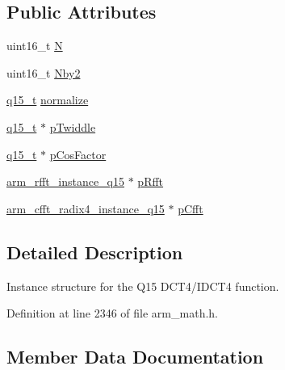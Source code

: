 \subsection*{Public Attributes}
\begin{DoxyCompactItemize}
\item 
uint16\+\_\+t \hyperlink{structarm__dct4__instance__q15_a53d24009bb9b2e93d0aa07db7f1a6c25}{N}
\item 
uint16\+\_\+t \hyperlink{structarm__dct4__instance__q15_af43dcbbc2fc661ffbc525afe3dcbd7da}{Nby2}
\item 
\hyperlink{arm__math_8h_ab5a8fb21a5b3b983d5f54f31614052ea}{q15\+\_\+t} \hyperlink{structarm__dct4__instance__q15_a197098140d68e89a08f7a249003a0b86}{normalize}
\item 
\hyperlink{arm__math_8h_ab5a8fb21a5b3b983d5f54f31614052ea}{q15\+\_\+t} $\ast$ \hyperlink{structarm__dct4__instance__q15_abc6c847e9f906781e1d5da40e9aafa76}{p\+Twiddle}
\item 
\hyperlink{arm__math_8h_ab5a8fb21a5b3b983d5f54f31614052ea}{q15\+\_\+t} $\ast$ \hyperlink{structarm__dct4__instance__q15_ac76df681b1bd502fb4874c06f055dded}{p\+Cos\+Factor}
\item 
\hyperlink{structarm__rfft__instance__q15}{arm\+\_\+rfft\+\_\+instance\+\_\+q15} $\ast$ \hyperlink{structarm__dct4__instance__q15_a11cf95c1cd9dd2dd5e4b81b8f88dc208}{p\+Rfft}
\item 
\hyperlink{structarm__cfft__radix4__instance__q15}{arm\+\_\+cfft\+\_\+radix4\+\_\+instance\+\_\+q15} $\ast$ \hyperlink{structarm__dct4__instance__q15_a7284932ee8c36107c33815eb62eadffc}{p\+Cfft}
\end{DoxyCompactItemize}


\subsection{Detailed Description}
Instance structure for the Q15 D\+C\+T4/\+I\+D\+C\+T4 function. 

Definition at line 2346 of file arm\+\_\+math.\+h.



\subsection{Member Data Documentation}
\mbox{\label{structarm__dct4__instance__q15_a53d24009bb9b2e93d0aa07db7f1a6c25}} 
